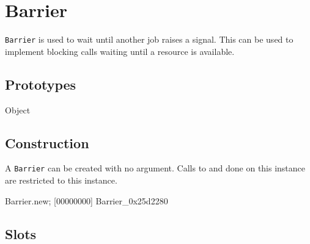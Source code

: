 
\section{Barrier}

\lstinline|Barrier| is used to wait until another job raises a signal.
This can be used to implement blocking calls waiting until a resource
is available.

\subsection{Prototypes}

\begin{refObjects}
\item[Object]
\end{refObjects}

\subsection{Construction}

A \lstinline|Barrier| can be created with no argument.  Calls to
 and  done on this instance are restricted to
this instance.

\begin{urbiscript}[firstnumber=1]
Barrier.new;
[00000000] Barrier_0x25d2280
\end{urbiscript}

\subsection{Slots}

